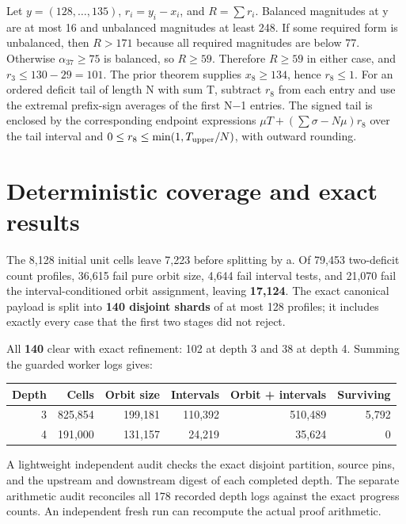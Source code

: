 \documentclass[11pt,letterpaper]{article}
\begin{document}
Let \(y=(128,\dots,135)\), \(r_i=y_i-x_i\), and \(R=\sum r_i\). Balanced
magnitudes at y are at most 16 and unbalanced magnitudes at least 248.
If some required form is unbalanced, then \(R>171\) because all required
magnitudes are below 77. Otherwise \(\alpha_{37}\ge75\) is balanced, so
\(R\ge59\). Therefore \(R\ge59\) in either case, and
\(r_3\le130-29=101\). The prior theorem supplies \(x_8\ge134\), hence
\textbf{\(r_8\le1\)}. For an ordered deficit tail of length N with sum
T, subtract \(r_8\) from each entry and use the extremal prefix-sign
averages of the first N−1 entries. The signed tail is enclosed by the
corresponding endpoint expressions \(\mu T+(\sum\sigma-N\mu)r_8\) over
the tail interval and \(0\le r_8\le\min(1,T_{\rm upper}/N)\), with
outward rounding.

\section{Deterministic coverage and exact
results}\label{deterministic-coverage-and-exact-results}

The 8,128 initial unit cells leave 7,223 before splitting by a. Of
79,453 two-deficit count profiles, 36,615 fail pure orbit size, 4,644
fail interval tests, and 21,070 fail the interval-conditioned orbit
assignment, leaving \textbf{17,124}. The exact canonical payload is
split into \textbf{140 disjoint shards} of at most 128 profiles; it
includes exactly every case that the first two stages did not reject.

All \textbf{140} clear with exact refinement: 102 at depth 3 and 38 at
depth 4. Summing the guarded worker logs gives:

\begin{center}
\small
\begin{tabular}{rrrrrr}
\toprule
Depth & Cells & Orbit size & Intervals & Orbit + intervals & Surviving \\
\midrule
3 & 825,854 & 199,181 & 110,392 & 510,489 & 5,792 \\
4 & 191,000 & 131,157 & 24,219 & 35,624 & 0 \\
\bottomrule
\end{tabular}
\end{center}

A lightweight independent audit checks the exact disjoint partition,
source pins, and the upstream and downstream digest of each completed
depth. The separate arithmetic audit reconciles all 178 recorded depth
logs against the exact progress counts. An independent fresh run can
recompute the actual proof arithmetic.
\end{document}
